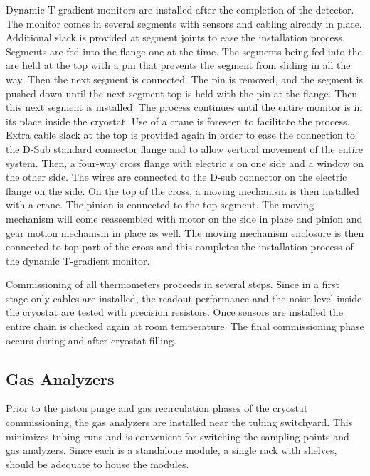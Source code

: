 Dynamic T-gradient monitors are installed after the completion of the detector.
The monitor comes in several segments with sensors and cabling already
in place. Additional slack is provided at segment joints to ease the
installation process. Segments are fed into the flange one at the
time. The segments being fed into the  are held at the top
with a pin that prevents the segment from sliding in all the way. Then the next
segment is connected. The pin is removed, and the
segment is pushed down until the next segment top is held with the
pin at the flange. Then this next segment is installed. The
process  continues until the entire monitor is in its place
inside the cryostat. Use of a crane is foreseen to facilitate the process.
Extra cable slack at the top is provided again in order to ease  the
connection to the D-Sub standard connector flange and to allow  vertical movement of the
entire system. Then, a four-way cross flange with electric \fdth{}s on
one side and a window on the other side. The wires are connected to
the D-sub connector on the electric flange \fdth on the side. On the
top of the cross, a moving mechanism is then installed with a crane.
The pinion is connected to the top segment. The moving mechanism will
come reassembled with motor on the side in place and pinion and gear
motion mechanism in place as well. The moving mechanism enclosure  is then connected to top part of the cross and this completes the
installation process of the dynamic T-gradient monitor.

Commissioning of all thermometers proceeds in several steps. Since in a first stage only cables are installed,
the readout performance and the noise level inside the cryostat are
tested with precision resistors. Once sensors are installed the entire chain is checked again at room temperature.
The final commissioning phase occurs during and after cryostat filling.  


\subsection{Gas Analyzers}
\label{sec:fdgen-slow-cryo-install-ga}
 
Prior to the piston purge and gas recirculation phases of the cryostat commissioning, the gas analyzers are installed near the %
tubing switchyard. This minimizes tubing runs and is  convenient for switching the sampling points and gas analyzers. Since each is a standalone module, a single rack with shelves, should be adequate to house the modules.


